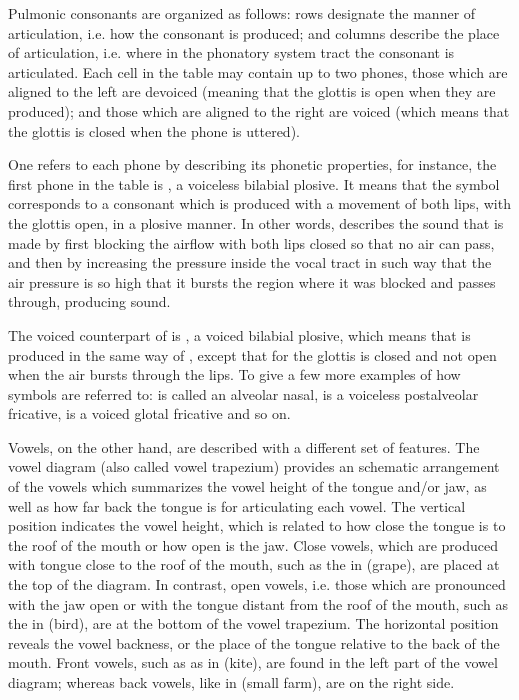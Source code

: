 Pulmonic consonants are organized as follows: rows designate the manner of articulation, i.e. how the consonant is produced; and columns describe the place of articulation, i.e. where in the phonatory system tract the consonant is articulated. Each cell in the table may contain up to two phones, those which are aligned to the left are devoiced (meaning that the glottis is open when they are produced); and those which are aligned to the right are voiced (which means that the glottis is closed when the phone is uttered). 

One refers to each phone by describing its phonetic properties, for instance, the first phone in the table is \ipa{[p]}, a voiceless bilabial plosive. It means that the symbol \ipa{[p]} corresponds to a consonant which is produced with a movement of both lips, with the glottis open, in a plosive manner. In other words, \ipa{[p]} describes the sound that is made by first blocking the airflow with both lips closed so that no air can pass, and then by increasing the pressure inside the vocal tract in such way that the air pressure is so high that it bursts the region where it was blocked and passes through, producing sound.

The voiced counterpart of \ipa{[p]} is \ipa{[b]}, a voiced bilabial plosive, which means that \ipa{[b]} is produced in the same way of \ipa{[p]}, except that for \ipa{[b]} the glottis is closed and not open when the air bursts through the lips. To give a few more examples of how symbols are referred to: \ipa{[n]} is called an alveolar nasal, \ipa{[S]} is a voiceless postalveolar fricative, \ipa{[H]} is a voiced glotal fricative and so on.

Vowels, on the other hand, are described with a different set of features. The vowel diagram (also called vowel trapezium) provides an schematic arrangement of the vowels which summarizes the vowel height of the tongue and/or jaw, as well as how far back the tongue is for articulating each vowel. The vertical position indicates the vowel height, which is related to how close the tongue is to the roof of the mouth or how open is the jaw. Close vowels, which are produced with tongue close to the roof of the mouth, such as the \ipa{[u]} in  (grape), are placed at the top of the diagram. In contrast, open vowels, i.e. those which are pronounced with the jaw open or with the tongue distant from the roof of the mouth, such as the \ipa{[a]} in  (bird), are at the bottom of the vowel trapezium. The horizontal position reveals the vowel backness, or the place of the tongue relative to the back of the mouth. Front vowels, such as \ipa{[i]} as in  (kite), are found in the left part of the vowel diagram; whereas back vowels, like \ipa{[O]} in  (small farm), are on the right side.

